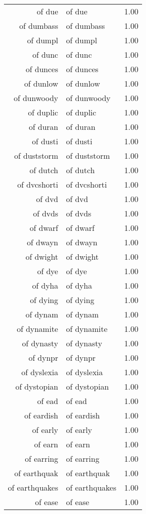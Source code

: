 \begin{table}[ht]
\begin{tabular}{rlr}
  of due & of due & 1.00 \\ 
  of dumbass & of dumbass & 1.00 \\ 
  of dumpl & of dumpl & 1.00 \\ 
  of dunc & of dunc & 1.00 \\ 
  of dunces & of dunces & 1.00 \\ 
  of dunlow & of dunlow & 1.00 \\ 
  of dunwoody & of dunwoody & 1.00 \\ 
  of duplic & of duplic & 1.00 \\ 
  of duran & of duran & 1.00 \\ 
  of dusti & of dusti & 1.00 \\ 
  of duststorm & of duststorm & 1.00 \\ 
  of dutch & of dutch & 1.00 \\ 
  of dvcshorti & of dvcshorti & 1.00 \\ 
  of dvd & of dvd & 1.00 \\ 
  of dvds & of dvds & 1.00 \\ 
  of dwarf & of dwarf & 1.00 \\ 
  of dwayn & of dwayn & 1.00 \\ 
  of dwight & of dwight & 1.00 \\ 
  of dye & of dye & 1.00 \\ 
  of dyha & of dyha & 1.00 \\ 
  of dying & of dying & 1.00 \\ 
  of dynam & of dynam & 1.00 \\ 
  of dynamite & of dynamite & 1.00 \\ 
  of dynasty & of dynasty & 1.00 \\ 
  of dynpr & of dynpr & 1.00 \\ 
  of dyslexia & of dyslexia & 1.00 \\ 
  of dystopian & of dystopian & 1.00 \\ 
  of ead & of ead & 1.00 \\ 
  of eardish & of eardish & 1.00 \\ 
  of early & of early & 1.00 \\ 
  of earn & of earn & 1.00 \\ 
  of earring & of earring & 1.00 \\ 
  of earthquak & of earthquak & 1.00 \\ 
  of earthquakes & of earthquakes & 1.00 \\ 
  of ease & of ease & 1.00 \\ 

\end{tabular}
\end{table}
